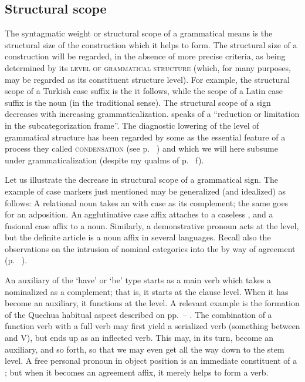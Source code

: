 \subsection{Structural scope} \label{sec:4.3.1}

The syntagmatic weight or structural scope of a grammatical means is the structural size of the construction which it helps to form. The structural size of a construction will be regarded, in the absence of more precise criteria, as being determined by its \textsc{level of grammatical structure} (which, for many purposes, may be regarded as its constituent structure level). For example, the structural scope of a Turkish case suffix is the \np it follows, while the scope of a Latin case suffix is the noun (in the traditional sense). The structural scope of a sign decreases with increasing grammaticalization. \citet[56f]{Vincent1980b} speaks of a “reduction or limitation in the subcategorization frame”. The diagnostic lowering of the level of grammatical structure has been regarded by some as the essential feature of a process they called \textsc{condensation} (see p.~\pageref{page12}\chk%
) and which we will here subsume under grammaticalization (despite my qualms of p.~\pageref{page12b}%
f).

Let us illustrate the decrease in structural scope of a grammatical sign. The example of case markers just mentioned may be generalized (and idealized) as follows: A relational noun takes an \np with case as its complement; the same goes for an adposition. An agglutinative case affix attaches to a caseless \np, and a fusional case affix to a noun. Similarly, a demonstrative pronoun acts at the \np level, but the definite article is a noun affix in several languages. Recall also the observations on the intrusion of nominal categories into the \np by way of agreement (p.~\pageref{page63}\chk%
).

An auxiliary of the ‘have’ or ‘be’ type starts as a main verb which takes a nominalized \vp as a complement; that is, it starts at the clause level. When it has become an auxiliary, it functions at the \vp level. A relevant example is the formation of the Quechua habitual aspect described on pp.~\pageref{page33b}--\pageref{page34}\chk%
. The combination of a function verb with a full verb may first yield a serialized verb (something between \vp and V), but ends up as an inflected verb. This may, in its turn, become an auxiliary, and so forth, so that we may even get all the way down to the stem level. A free personal pronoun in object position is an immediate constituent of a \vp; but when it becomes an agreement affix, it merely helps to form a verb.

